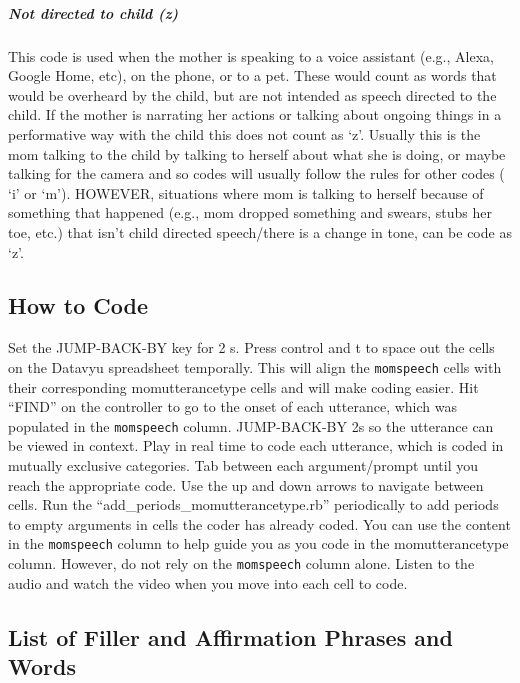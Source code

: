 \documentclass[
  12pt,
]{book}
\begin{document}
\hypertarget{not_directed_to_child}{%
\subparagraph*{Not directed to child (z)}\label{not_directed_to_child}}

This code is used when the mother is speaking to a voice assistant (e.g., Alexa, Google Home, etc), on the phone, or to a pet. These would count as words that would be overheard by the child, but are not intended as speech directed to the child.
If the mother is narrating her actions or talking about ongoing things in a performative way with the child this does not count as `z'. Usually this is the mom talking to the child by talking to herself about what she is doing, or maybe talking for the camera and so codes will usually follow the rules for other codes ( `i' or `m').
HOWEVER, situations where mom is talking to herself because of something that happened (e.g., mom dropped something and swears, stubs her toe, etc.) that isn't child directed speech/there is a change in tone, can be code as `z'.

\hypertarget{how-to-code-1}{%
\subsection*{How to Code}\label{how-to-code-1}}

Set the JUMP-BACK-BY key for 2 s.
Press control and t to space out the cells on the Datavyu spreadsheet temporally. This will align the \texttt{momspeech} cells with their corresponding momutterancetype cells and will make coding easier.
Hit ``FIND'' on the controller to go to the onset of each utterance, which was populated in the \texttt{momspeech} column.
JUMP-BACK-BY 2s so the utterance can be viewed in context.
Play in real time to code each utterance, which is coded in mutually exclusive categories. Tab between each argument/prompt until you reach the appropriate code. Use the up and down arrows to navigate between cells.
Run the ``add\_periods\_momutterancetype.rb'' periodically to add periods to empty arguments in cells the coder has already coded.
You can use the content in the \texttt{momspeech} column to help guide you as you code in the momutterancetype column. However, do not rely on the \texttt{momspeech} column alone. Listen to the audio and watch the video when you move into each cell to code.

\hypertarget{filler_words}{%
\subsection*{List of Filler and Affirmation Phrases and Words}\label{filler_words}}
\end{document}
